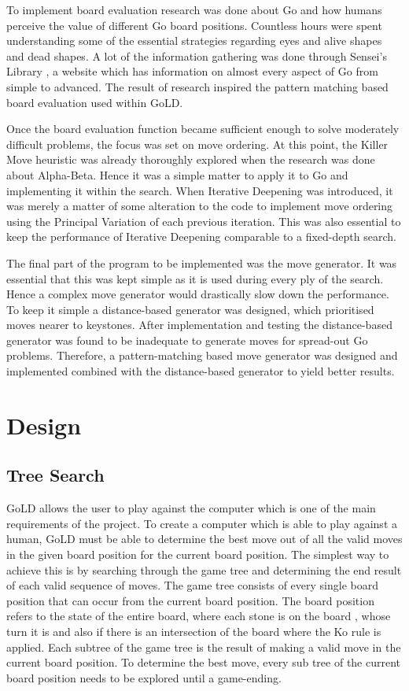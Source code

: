 \documentclass{l4proj}
\begin{document}
To implement board evaluation research was done about Go and how humans perceive the value of different Go board positions. Countless hours were spent understanding some of the essential strategies regarding eyes and alive shapes and dead shapes. A lot of the information gathering was done through Sensei’s Library \cite{Senseis} , a website which has information on almost every aspect of Go from simple to advanced. The result of research inspired the pattern matching based board evaluation used within GoLD.

Once the board evaluation function became sufficient enough to solve moderately difficult problems, the focus was set on move ordering. At this point, the Killer Move heuristic was already thoroughly explored when the research was done about Alpha-Beta. Hence it was a simple matter to apply it to Go and implementing it within the search. When Iterative Deepening was introduced, it was merely a matter of some alteration to the code to implement move ordering using the Principal Variation of each previous iteration. This was also essential to keep the performance of Iterative Deepening comparable to a fixed-depth search.

The final part of the program to be implemented was the move generator. It was essential that this was kept simple as it is used during every ply of the search. Hence a complex move generator would drastically slow down the performance. To keep it simple a distance-based generator was designed, which prioritised moves nearer to keystones. After implementation and testing the distance-based generator was found to be inadequate to generate moves for spread-out Go problems. Therefore, a pattern-matching based move generator was designed and implemented combined with the distance-based generator to yield better results.








\chapter{Design}


\section{Tree Search}
GoLD allows the user to play against the computer which is one of the main requirements of the project. To create a computer which is able to play against a human, GoLD must be able to determine the best move out of all the valid moves in the given board position for the current board position. The simplest way to achieve this is by searching through the game tree and determining the end result of each valid sequence of moves. The game tree consists of every single board position that can occur from the current board position. The board position refers to the state of the entire board, where each stone is on the board , whose turn it is and also if there is an intersection of the board where the Ko rule is applied. Each subtree of the game tree is the result of making a valid move in the current board position. To determine the best move, every sub tree of the current board position needs to be explored until a game-ending.
\end{document}
